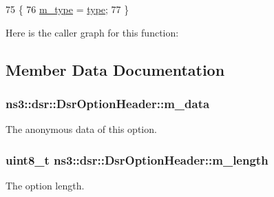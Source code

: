 \begin{DoxyCode}
75 \{
76   \hyperlink{classns3_1_1dsr_1_1DsrOptionHeader_a6cd1d1f710ffd6cdfc2774b734b3c65e}{m\_type} = \hyperlink{visualizer-ideas_8txt_add98db9e15e2a58cf2b57623e7aa893a}{type};
77 \}
\end{DoxyCode}


Here is the caller graph for this function\+:




\subsection{Member Data Documentation}
\subsubsection[{\texorpdfstring{m\+\_\+data}{m_data}}]{ ns3\+::dsr\+::\+Dsr\+Option\+Header\+::m\+\_\+data\hspace{0.3cm}{\ttfamily [private]}}\hypertarget{classns3_1_1dsr_1_1DsrOptionHeader_a1016d3f0675b3bbd6df305d64fb83a16}{}\label{classns3_1_1dsr_1_1DsrOptionHeader_a1016d3f0675b3bbd6df305d64fb83a16}


The anonymous data of this option. 

\subsubsection[{\texorpdfstring{m\+\_\+length}{m_length}}]{\setlength{\rightskip}{0pt plus 5cm}uint8\+\_\+t ns3\+::dsr\+::\+Dsr\+Option\+Header\+::m\+\_\+length\hspace{0.3cm}{\ttfamily [private]}}\hypertarget{classns3_1_1dsr_1_1DsrOptionHeader_a6ac993506a87c37e9f4af1a6f5b40d7f}{}\label{classns3_1_1dsr_1_1DsrOptionHeader_a6ac993506a87c37e9f4af1a6f5b40d7f}


The option length. 

